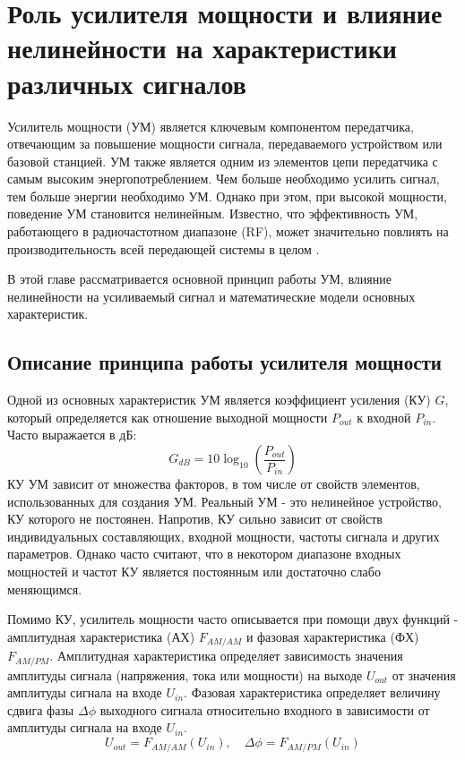 \section{Роль усилителя мощности и влияние нелинейности
на характеристики различных сигналов}
Усилитель мощности (УМ) является ключевым компонентом передатчика,
отвечающим за повышение мощности сигнала, передаваемого устройством или
базовой станцией. УМ также является одним из элементов цепи передатчика с
самым высоким энергопотреблением. Чем больше необходимо усилить сигнал, тем
больше энергии необходимо УМ. Однако при этом, при высокой мощности,
поведение УМ становится нелинейным. Известно, что эффективность УМ,
работающего в радиочастотном диапазоне (RF), может значительно повлиять на
производительность всей передающей системы
в целом \cite{Lie2018}.

В этой главе рассматривается основной принцип работы УМ, влияние
нелинейности на усиливаемый сигнал и математические модели основных
характеристик.


\subsection{Описание принципа работы усилителя мощности}
Одной из основных характеристик УМ является коэффициент усиления (КУ) $G$,
который определяется как отношение выходной мощности $P_{out}$ к входной
$P_{in}$. Часто выражается в дБ:
\begin{equation}
    G_{dB} = 10\log_{10}\left(\frac{P_{out}}{P_{in}}\right)
\end{equation}
КУ УМ зависит от множества факторов, в том числе от свойств элементов,
использованных для создания УМ. Реальный УМ - это нелинейное устройство, КУ
которого не постоянен. Напротив, КУ сильно зависит от свойств
индивидуальных составляющих, входной мощности, частоты сигнала и других
параметров. Однако часто считают, что в некотором диапазоне входных
мощностей и частот КУ является постоянным или достаточно слабо
меняющимся.

Помимо КУ, усилитель мощности часто описывается при помощи двух функций -
амплитудная характеристика (АХ) $F_{AM/AM}$ и фазовая характеристика (ФХ)
$F_{AM/PM}$. Амплитудная характеристика определяет зависимость значения
амплитуды сигнала (напряжения, тока или мощности) на выходе $U_{out}$ от
значения амплитуды сигнала на входе $U_{in}$. Фазовая характеристика
определяет величину сдвига фазы $\Delta\phi$ выходного сигнала относительно
входного в зависимости от амплитуды сигнала на входе $U_{in}$.
\begin{equation}
    U_{out} = F_{AM/AM}(U_{in}), \quad \Delta\phi = F_{AM/PM}(U_{in})
\end{equation}

